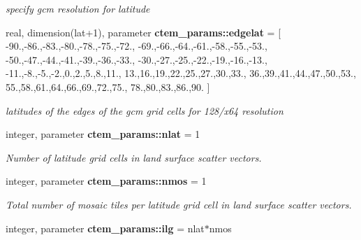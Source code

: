 \begin{DoxyCompactItemize}
\begin{DoxyCompactList}\small\item\em specify gcm resolution for latitude \end{DoxyCompactList}\item 
\hypertarget{namespacectem__params_ae540e0248a149a2d22fb9888a8cb113e}{}real, dimension(lat+1), parameter {\bfseries ctem\+\_\+params\+::edgelat} = \mbox{[} -\/90.,-\/86.,-\/83.,-\/80.,-\/78.,-\/75.,-\/72., -\/69.,-\/66.,-\/64.,-\/61.,-\/58.,-\/55.,-\/53., -\/50.,-\/47.,-\/44.,-\/41.,-\/39.,-\/36.,-\/33., -\/30.,-\/27.,-\/25.,-\/22.,-\/19.,-\/16.,-\/13., -\/11.,-\/8.,-\/5.,-\/2.,0.,2.,5.,8.,11., 13.,16.,19.,22.,25.,27.,30.,33., 36.,39.,41.,44.,47.,50.,53., 55.,58.,61.,64.,66.,69.,72.,75., 78.,80.,83.,86.,90. \mbox{]}\label{namespacectem__params_ae540e0248a149a2d22fb9888a8cb113e}

\begin{DoxyCompactList}\small\item\em latitudes of the edges of the gcm grid cells for 128/x64 resolution \end{DoxyCompactList}\item 
\hypertarget{namespacectem__params_aed4f6795fdebbed671839f1af3b98a9e}{}integer, parameter {\bfseries ctem\+\_\+params\+::nlat} = 1\label{namespacectem__params_aed4f6795fdebbed671839f1af3b98a9e}

\begin{DoxyCompactList}\small\item\em Number of latitude grid cells in land surface scatter vectors. \end{DoxyCompactList}\item 
\hypertarget{namespacectem__params_acc702cf69e445c30a2cf60576fdd86f2}{}integer, parameter {\bfseries ctem\+\_\+params\+::nmos} = 1\label{namespacectem__params_acc702cf69e445c30a2cf60576fdd86f2}

\begin{DoxyCompactList}\small\item\em Total number of mosaic tiles per latitude grid cell in land surface scatter vectors. \end{DoxyCompactList}\item 
\hypertarget{namespacectem__params_a95fae29beaeaf9da9c112dbb76ab02db}{}integer, parameter {\bfseries ctem\+\_\+params\+::ilg} = nlat$\ast$nmos\label{namespacectem__params_a95fae29beaeaf9da9c112dbb76ab02db}


\end{DoxyCompactItemize}
